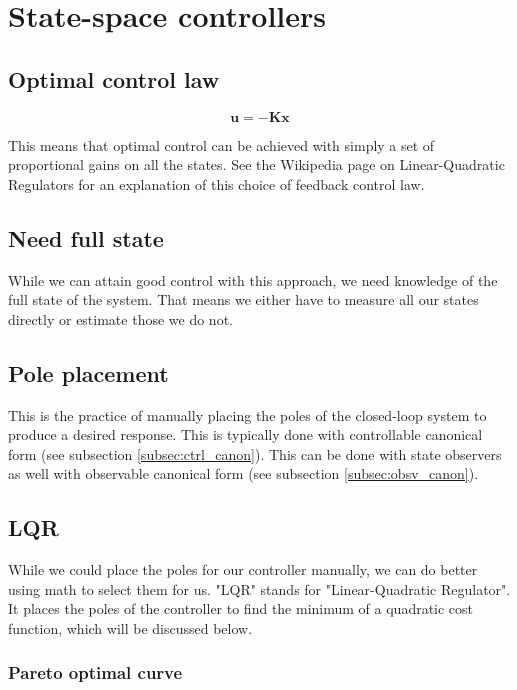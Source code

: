 \documentclass[10pt,conference,compsoc]{IEEEtran}
\newcommand{\mtx}[1] {\bm #1}
\begin{document}
\section{State-space controllers}

\subsection{Optimal control law}

\begin{equation}
  \mtx{u} = -\mtx{K}\mtx{x}
\end{equation}

This means that optimal control can be achieved with simply a set of
proportional gains on all the states. See the Wikipedia page on Linear-Quadratic Regulators \cite{bib:lqr} for an explanation of this choice of feedback control
law.

\subsection{Need full state}

While we can attain good control with this approach, we need knowledge of the
full state of the system. That means we either have to measure all our states
directly or estimate those we do not.

\subsection{Pole placement}

This is the practice of manually placing the poles of the closed-loop system to
produce a desired response. This is typically done with controllable canonical
form (see subsection \ref{subsec:ctrl_canon}). This can be done with state
observers as well with observable canonical form (see subsection
\ref{subsec:obsv_canon}).

\subsection{LQR}

While we could place the poles for our controller manually, we can do better
using math to select them for us. "LQR" stands for "Linear-Quadratic Regulator".
It places the poles of the controller to find the minimum of a quadratic cost
function, which will be discussed below.

\subsubsection{Pareto optimal curve}
\end{document}
